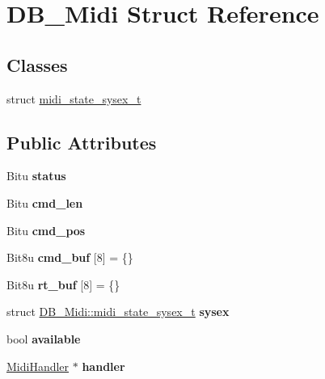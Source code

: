 \hypertarget{structDB__Midi}{\section{D\-B\-\_\-\-Midi Struct Reference}
\label{structDB__Midi}
}
\subsection*{Classes}
\begin{DoxyCompactItemize}
\item 
struct \hyperlink{structDB__Midi_1_1midi__state__sysex__t}{midi\-\_\-state\-\_\-sysex\-\_\-t}
\end{DoxyCompactItemize}
\subsection*{Public Attributes}
\begin{DoxyCompactItemize}
\item 
\hypertarget{structDB__Midi_a8e81c41e0c64273c33aa9236f30200a0}{Bitu {\bfseries status}}\label{structDB__Midi_a8e81c41e0c64273c33aa9236f30200a0}

\item 
\hypertarget{structDB__Midi_a79df460c7dd6bb70f90a37a9c7772740}{Bitu {\bfseries cmd\-\_\-len}}\label{structDB__Midi_a79df460c7dd6bb70f90a37a9c7772740}

\item 
\hypertarget{structDB__Midi_a4a1c527932714744a7b7fdc1ee3ce29f}{Bitu {\bfseries cmd\-\_\-pos}}\label{structDB__Midi_a4a1c527932714744a7b7fdc1ee3ce29f}

\item 
\hypertarget{structDB__Midi_aa26b12bb149741ced0728854d6416b04}{Bit8u {\bfseries cmd\-\_\-buf} \mbox{[}8\mbox{]} = \{\}}\label{structDB__Midi_aa26b12bb149741ced0728854d6416b04}

\item 
\hypertarget{structDB__Midi_a439dfa10ed85d22fd7e84e8efa27a1d0}{Bit8u {\bfseries rt\-\_\-buf} \mbox{[}8\mbox{]} = \{\}}\label{structDB__Midi_a439dfa10ed85d22fd7e84e8efa27a1d0}

\item 
\hypertarget{structDB__Midi_a25de631d81efc1dfecfb07cfb59d97b0}{struct \hyperlink{structDB__Midi_1_1midi__state__sysex__t}{D\-B\-\_\-\-Midi\-::midi\-\_\-state\-\_\-sysex\-\_\-t} {\bfseries sysex}}\label{structDB__Midi_a25de631d81efc1dfecfb07cfb59d97b0}

\item 
\hypertarget{structDB__Midi_a62f3f653f125456e3259bf641281c461}{bool {\bfseries available}}\label{structDB__Midi_a62f3f653f125456e3259bf641281c461}

\item 
\hypertarget{structDB__Midi_a40809c2b8633576c439935c250e4981b}{\hyperlink{classMidiHandler}{Midi\-Handler} $\ast$ {\bfseries handler}}\label{structDB__Midi_a40809c2b8633576c439935c250e4981b}

\end{DoxyCompactItemize}


